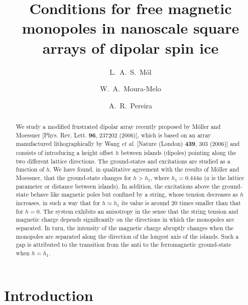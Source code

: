 \documentclass[aps,prb,twocolumn,floatfix,showpacs,amsmath,amssymb]{revtex4}
\begin{document}

\title{Conditions for free magnetic monopoles in nanoscale square
arrays of dipolar spin ice}


\author{L.\ A.\ S.\ M\'{o}l}
\author{W.\ A.\ Moura-Melo}
\author{A.\ R.\ Pereira}

%
\begin{abstract}
We study a modified frustrated dipolar array recently proposed by
M\"{o}ller and Moessner [Phys. Rev. Lett. \textbf{96}, 237202
(2006)], which is based on an array manufactured lithographically
by Wang \emph{et al.} [Nature (London) \textbf{439}, 303 (2006)]
and consists of introducing a height offset $h$ between islands
(dipoles) pointing along the two different lattice directions. The
ground-states and excitations are studied as a function of $h$. We
have found, in qualitative agreement with the results of
M\"{o}ller and Moessner, that the ground-state changes for
$h>h_{1}$, where $h_{1}= 0.444a$ ($a$ is the lattice parameter or
distance between islands). In addition, the excitations above the
ground-state behave like magnetic poles but confined by a string,
whose tension decreases as $h$ increases, in such a way that for
$h\approx h_1$ its value is around 20 times smaller than that for
$h=0$. The system exhibits an anisotropy in the sense that the
string tension and magnetic charge depends significantly on the
directions in which the monopoles are separated. In turn, the
intensity of the magnetic charge abruptly changes when the monopoles
are separated along the direction of the longest axis of the islands.
Such a gap is attributed to the transition from the anti to the ferromagnetic
ground-state when $h=h_1$.
\end{abstract}
%

\maketitle

\section{Introduction}
\end{document}
